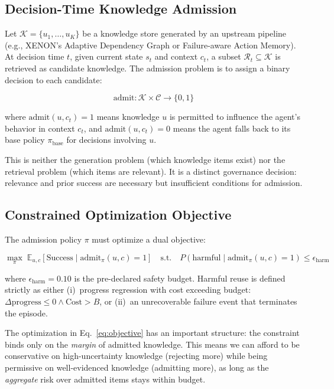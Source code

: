 \documentclass[letterpaper]{article}
\begin{document}
\subsection{Decision-Time Knowledge Admission}

Let $\mathcal{K} = \{u_1, \ldots, u_K\}$ be a knowledge store generated by an upstream pipeline (e.g., \textsc{XENON}'s Adaptive Dependency Graph or Failure-aware Action Memory). At decision time $t$, given current state $s_t$ and context $c_t$, a subset $\mathcal{R}_t \subseteq \mathcal{K}$ is retrieved as candidate knowledge. The admission problem is to assign a binary decision to each candidate:

\begin{equation}
\label{eq:admission}
\text{admit}: \mathcal{K} \times \mathcal{C} \rightarrow \{0, 1\}
\end{equation}

where $\text{admit}(u, c_t) = 1$ means knowledge $u$ is permitted to influence the agent's behavior in context $c_t$, and $\text{admit}(u, c_t) = 0$ means the agent falls back to its base policy $\pi_{\text{base}}$ for decisions involving $u$.

This is neither the generation problem (which knowledge items exist) nor the retrieval problem (which items are relevant). It is a distinct governance decision: relevance and prior success are necessary but insufficient conditions for admission.

\subsection{Constrained Optimization Objective}

The admission policy $\pi$ must optimize a dual objective:

\begin{equation}
\label{eq:objective}
\max_{\pi} \; \mathbb{E}_{u,c}\left[\text{Success} \mid \text{admit}_\pi(u,c) = 1\right] \quad \text{s.t.} \quad P(\text{harmful} \mid \text{admit}_\pi(u,c) = 1) \leq \epsilon_{\text{harm}}
\end{equation}

where $\epsilon_{\text{harm}} = 0.10$ is the pre-declared safety budget. Harmful reuse is defined strictly as either (i)~progress regression with cost exceeding budget: $\Delta\text{progress} \leq 0 \land \text{Cost} > B$, or (ii)~an unrecoverable failure event that terminates the episode.

The optimization in Eq.~\ref{eq:objective} has an important structure: the constraint binds only on the \emph{margin} of admitted knowledge. This means we can afford to be conservative on high-uncertainty knowledge (rejecting more) while being permissive on well-evidenced knowledge (admitting more), as long as the \emph{aggregate} risk over admitted items stays within budget.
\end{document}
